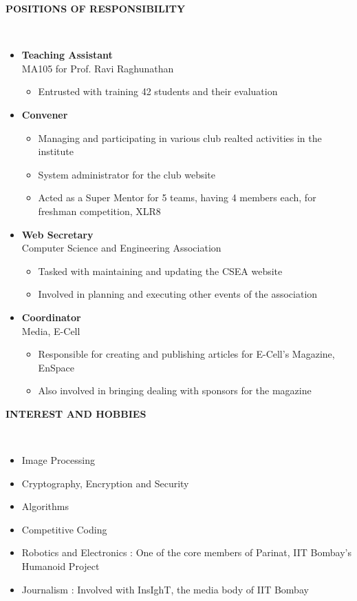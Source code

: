 \documentclass[a4paper,10pt]{article}
\newcommand{\lsep}{-0.5cm}
\newcommand{\resheading}[1]{{\small \colorbox{mygrey}{\begin{minipage}{0.975\textwidth}{\textbf{#1 \vphantom{p\^{E}}}}\end{minipage}}}}
\begin{document}
\resheading{\textbf{POSITIONS OF RESPONSIBILITY} }\\[\lsep]
\begin{itemize}\itemsep 0em
\item {\bf Teaching Assistant} \\
\hspace*{5mm} MA105 for Prof. Ravi Raghunathan
\begin{itemize}
\item Entrusted with training 42 students and their evaluation
\end{itemize}

\item {\bf Convener}  \\
\hspace*{5mm}{\bf Electronics Club}
\begin{itemize}
\itemsep 0em
\item Managing and participating in various club realted activities in the institute
\item System administrator for the club website
\item Acted as a Super Mentor for 5 teams, having 4 members each, for freshman competition, XLR8
\end{itemize}

\item {\bf Web Secretary}  \\
\hspace*{5mm} Computer Science and Engineering Association
\begin{itemize}
\itemsep 0em
\item Tasked with maintaining and updating the CSEA website
\item Involved in planning and executing other events of the association
\end{itemize}

\item {\bf Coordinator}  \\
\hspace*{5mm} Media, E-Cell
\begin{itemize}
\itemsep 0em
\item Responsible for creating and publishing articles for E-Cell's Magazine, EnSpace
\item Also involved in bringing dealing with sponsors for the magazine
\end{itemize}

\end{itemize}

\resheading{\textbf{INTEREST AND HOBBIES} }\\[\lsep]
\begin{itemize}
\itemsep 0em
\item Image Processing
\item Cryptography, Encryption and Security
\item Algorithms
\item Competitive Coding
\item Robotics and Electronics : One of the core members of Parinat, IIT Bombay's Humanoid Project
\item Journalism : Involved with InsIghT, the media body of IIT Bombay
\end{itemize}
\end{document}
